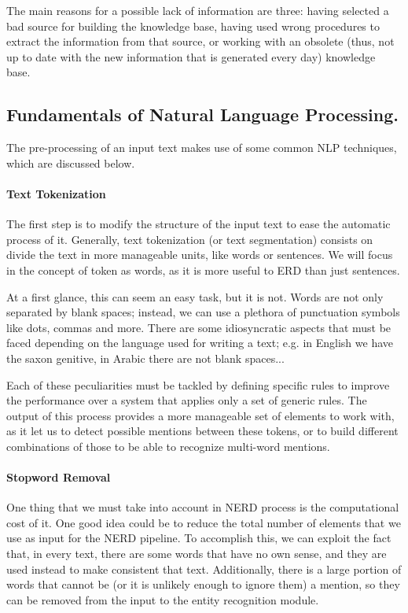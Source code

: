 The main reasons for a possible lack of information are three: having selected a bad source for building the knowledge base, having used wrong procedures to extract the information from that source, or working with an obsolete (thus, not up to date with the new information that is generated every day) knowledge base.



\subsection{Fundamentals of Natural Language Processing.}

The pre-processing of an input text makes use of some common NLP techniques, which are discussed below. 

\paragraph{Text Tokenization}
The first step is to modify the structure of the input text to ease the automatic process of it. Generally, text tokenization (or text segmentation) consists on divide the text in more manageable units, like words or sentences. We will focus in the concept of token as words, as it is more useful to ERD than just sentences.

At a first glance, this can seem an easy task, but it is not. Words are not only separated by blank spaces; instead, we can use a plethora of punctuation symbols like dots, commas and more. There are some idiosyncratic aspects that must be faced depending on the language used for writing a text; e.g. in English we have the saxon genitive, in Arabic there are not blank spaces...

Each of these peculiarities must be tackled by defining specific rules to improve the performance over a system that applies only a set of generic rules. The output of this process provides a more manageable set of elements to work with, as it let us to detect possible mentions between these tokens, or to build different combinations of those to be able to recognize multi-word mentions.

\paragraph{Stopword Removal}
One thing that we must take into account in NERD process is the computational cost of it. One good idea could be to reduce the total number of elements that we use as input for the NERD pipeline. To accomplish this, we can exploit the fact that, in every text, there are some words that have no own sense, and they are used instead to make consistent that text. Additionally, there is a large portion of words that cannot be (or it is unlikely enough to ignore them) a mention, so they can be removed from the input to the entity recognition module.

